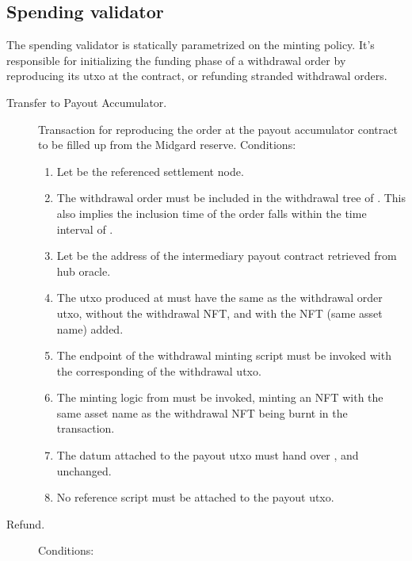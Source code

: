 \documentclass[../midgard.tex]{subfiles}
\begin{document}
\subsection{Spending validator}
\label{h:withdrawal-order-spending-validator}

The  spending validator is statically parametrized on the  minting policy.
It's responsible for initializing the funding phase of a withdrawal order by reproducing its utxo at the  contract, or refunding stranded withdrawal orders.

\begin{description}
  \item[Transfer to Payout Accumulator.] Transaction for reproducing the order at the payout accumulator contract to be filled up from the Midgard reserve.
    Conditions:
    \begin{enumerate}
      \item Let  be the referenced settlement node.
      \item The withdrawal order must be included in the withdrawal tree of .
        This also implies the inclusion time of the order falls within the time interval of .
      \item Let  be the address of the intermediary payout contract retrieved from hub oracle.
      \item The utxo produced at  must have the same  as the withdrawal order utxo, without the withdrawal NFT, and with the  NFT (same asset name) added.
      \item The  endpoint of the withdrawal minting script must be invoked with the corresponding  of the withdrawal utxo.
      \item The minting logic from  must be invoked, minting an NFT with the same asset name as the withdrawal NFT being burnt in the transaction.
      \item The datum attached to the payout utxo must hand over ,  and  unchanged.
      \item No reference script must be attached to the payout utxo.
    \end{enumerate}
  \item[Refund.] 
    Conditions:
    \begin{enumerate}

\end{enumerate}
\end{description}
\end{document}
